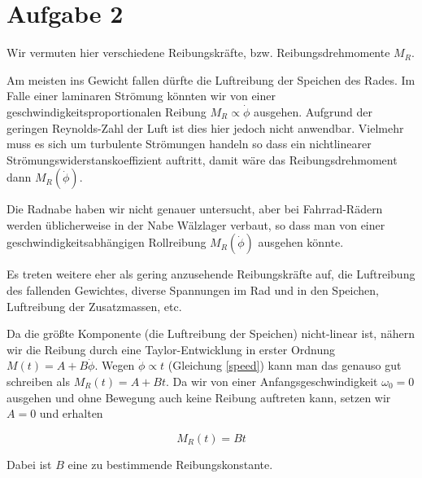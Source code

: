 \documentclass[a4paper,german,12pt,smallheadings]{scrartcl}
\begin{document}
\section*{Aufgabe 2}
Wir vermuten hier verschiedene Reibungskräfte, bzw. Reibungsdrehmomente $M_R$.

Am meisten ins Gewicht fallen dürfte die Luftreibung der Speichen des Rades. Im
Falle einer laminaren Strömung könnten wir von einer
geschwindigkeitsproportionalen Reibung $M_R \propto \dot{\phi}$ ausgehen.  Aufgrund der geringen
Reynolds-Zahl der Luft ist dies hier jedoch nicht anwendbar. Vielmehr muss es
sich um turbulente Strömungen handeln so dass ein nichtlinearer
Strömungswiderstanskoeffizient auftritt, damit wäre das Reibungsdrehmoment dann
$M_R(\dot{\phi})$.

Die Radnabe haben wir nicht genauer untersucht, aber bei Fahrrad-Rädern werden
üblicherweise in der Nabe Wälzlager verbaut, so dass man von einer
geschwindigkeitsabhängigen Rollreibung $M_R(\dot{\phi})$ ausgehen könnte.

Es treten weitere eher als gering anzusehende Reibungskräfte auf, die
Luftreibung des fallenden Gewichtes, diverse Spannungen im Rad und in den
Speichen, Luftreibung der Zusatzmassen, etc.

Da die größte Komponente (die Luftreibung der Speichen) nicht-linear ist,
nähern wir die Reibung durch eine Taylor-Entwicklung in erster Ordnung $
M(t) = A + B \dot{\phi}$. Wegen $\dot{\phi} \propto t$ (Gleichung \ref{speed})
kann man das genauso gut schreiben als $ M_R(t) = A + Bt$. Da wir von einer
Anfangsgeschwindigkeit $\omega_0=0$ ausgehen und ohne Bewegung auch keine
Reibung auftreten kann, setzen wir $A=0$ und erhalten

\begin{equation}
  M_R(t) = B t
\end{equation}

Dabei ist $B$ eine zu bestimmende Reibungskonstante.
\newpage
\begin{landscape}
  
\end{landscape}


\end{document}
